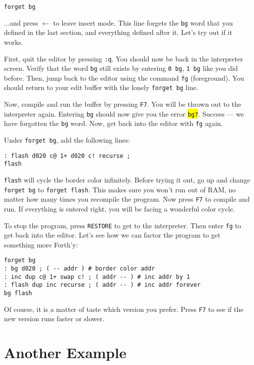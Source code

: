 \begin{verbatim}
forget bg
\end{verbatim}

...and press $\leftarrow$ to leave insert mode. This line forgets the \texttt{bg} word that you defined in the last section, and everything defined after it. Let's try out if it works.

First, quit the editor by pressing \texttt{:q}. You should now be back in the interpreter screen. Verify that the word \texttt{bg} still exists by  entering \texttt{0 bg}, \texttt{1 bg} like you did before. Then, jump back to the editor using the command \texttt{fg} (foreground). You should return to your edit buffer with the lonely \texttt{forget bg} line.

Now, compile and run the buffer by pressing \texttt{F7}. You will be thrown out to the interpreter again. Entering \texttt{bg} should now give you the error \colorbox{yellow}{\texttt{bg?}}. Success --- we have forgotten the \texttt{bg} word. Now, get back into the editor with \texttt{fg} again.

Under \texttt{forget bg}, add the following lines:

\begin{verbatim}
: flash d020 c@ 1+ d020 c! recurse ;
flash
\end{verbatim}

\texttt{flash} will cycle the border color infinitely. Before trying it out, go up and change \texttt{forget bg} to \texttt{forget flash}. This makes sure you won't run out of RAM, no matter how many times you recompile the program. Now press \texttt{F7} to compile and run. If everything is entered right, you will be facing a wonderful color cycle.

To stop the program, press \texttt{RESTORE} to get to the interpreter. Then enter \texttt{fg} to get back into the editor. Let's see how we can factor the program to get something more Forth'y:

\begin{verbatim}
forget bg
: bg d020 ; ( -- addr ) # border color addr
: inc dup c@ 1+ swap c! ; ( addr -- ) # inc addr by 1
: flash dup inc recurse ; ( addr -- ) # inc addr forever
bg flash
\end{verbatim}

Of course, it is a matter of taste which version you prefer. Press \texttt{F7} to see if the new version runs faster or slower.

\section{Another Example}

